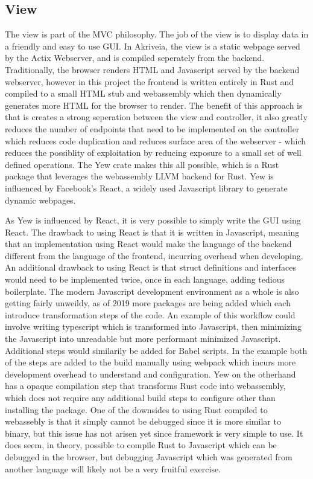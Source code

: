 \subsection{View}
\medskip
\label{view_section}
The view is part of the MVC philosophy.
The job of the view is to display data in a friendly and easy to use GUI.
In Akriveia, the view is a static webpage served by the Actix Webserver, and is compiled seperately from the backend.
Traditionally, the browser renders HTML and Javascript served by the backend webserver, however in this project the frontend is written entirely in Rust and compiled to a small HTML stub and webassembly which then dynamically generates more HTML for the browser to render.
The benefit of this approach is that is creates a strong seperation between the view and controller, it also greatly reduces the number of endpoints that need to be implemented on the controller which reduces code duplication and reduces surface area of the webserver - which reduces the possiblity of exploitation by reducing exposure to a small set of well defined operations.
The Yew crate makes this all possible, which is a Rust package that leverages the webassembly LLVM backend for Rust.
Yew is influenced by Facebook's \Gls{React}, a widely used Javascript library to generate dynamic webpages.

\bigskip
As Yew is influenced by React, it is very possible to simply write the GUI using React.
The drawback to using React is that it is written in Javascript, meaning that an implementation using React would make the language of the backend different from the language of the frontend, incurring overhead when developing.
An additional drawback to using React is that struct definitions and interfaces would need to be implemented twice, once in each language, adding tedious boilerplate.
The modern Javascript development environment as a whole is also getting fairly unweildy, as of 2019 more packages are being added which each introduce transformation steps of the code.
An example of this workflow could involve writing typescript which is transformed into Javascript, then minimizing the Javascript into unreadable but more performant minimized Javascript.
Additional steps would similarily be added for \Gls{Babel} scripts.
In the example both of the steps are added to the build manually using webpack which incurs more development overhead to understand and configuration.
Yew on the otherhand has a opaque compilation step that transforms Rust code into webassembly, which does not require any additional build steps to configure other than installing the package.
One of the downsides to using Rust compiled to webassebly is that it simply cannot be debugged since it is more similar to binary, but this issue has not arisen yet since framework is very simple to use.
It does seem, in theory, possible to compile Rust to Javascript which can be debugged in the browser, but debugging Javascript which was generated from another language will likely not be a very fruitful exercise.

